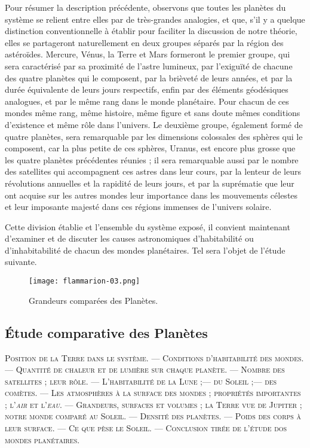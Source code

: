 \documentclass[a4paper, 11pt, oneside]{article}
\begin{document}
Pour résumer la description précédente, observons que toutes les planètes du système se relient entre elles par de très-grandes analogies, et que, s'il y a quelque distinction conventionnelle à établir pour faciliter la discussion de notre théorie, elles se partageront naturellement en deux groupes séparés par la région des astéroïdes. Mercure, Vénus, la Terre et Mars formeront le premier groupe, qui sera caractérisé par sa proximité de l'astre lumineux, par l'exiguïté de chacune des quatre planètes qui le composent, par la brièveté de leurs années, et par la durée équivalente de leurs jours respectifs, enfin par des éléments géodésiques analogues, et par le même rang dans le monde planétaire. Pour chacun de ces mondes même rang, même histoire, même figure et sans doute mêmes conditions d'existence et même rôle dans l'univers. Le deuxième groupe, également formé de quatre planètes, sera remarquable par les dimensions colossales des sphères qui le composent, car la plus petite de ces sphères, Uranus, est encore plus grosse que les quatre planètes précédentes réunies ; il sera remarquable aussi par le nombre des satellites qui accompagnent ces astres dans leur cours, par la lenteur de leurs révolutions annuelles et la rapidité de leurs jours, et par la suprématie que leur ont acquise sur les autres mondes leur importance dans les mouvements célestes et leur imposante majesté dans ces régions immenses de l'univers solaire.

Cette division établie et l'ensemble du système exposé, il convient maintenant d'examiner et de discuter les causes astronomiques d'habitabilité ou d'inhabitabilité de chacun des mondes planétaires. Tel sera l'objet de l'étude suivante.
\clearpage
\vspace*{\fill}
\begin{figure}[H]
\centering
\texttt{[image: flammarion-03.png]}
\caption{Grandeurs comparées des Planètes.}
\end{figure}
\vspace*{\fill}
\clearpage
\subsection{Étude comparative des Planètes}
\begin{center}
\scshape
\small
Position de la Terre dans le système. --- Conditions d'habitabilité des mondes. --- Quantité de chaleur et de lumière sur chaque planète. --- Nombre des satellites ; leur rôle. --- L'habitabilité de la Lune ;--- du Soleil ;--- des comètes. --- Les atmosphères à la surface des mondes ; propriétés importantes ; l'\emph{air} et l'\emph{eau}. --- Grandeurs, surfaces et volumes ; la Terre vue de Jupiter ; notre monde comparé au Soleil. --- Densité des planètes. --- Poids des corps à leur surface. --- Ce que pèse le Soleil. --- Conclusion tirée de l'étude dos mondes planétaires.
\end{center}
\end{document}
